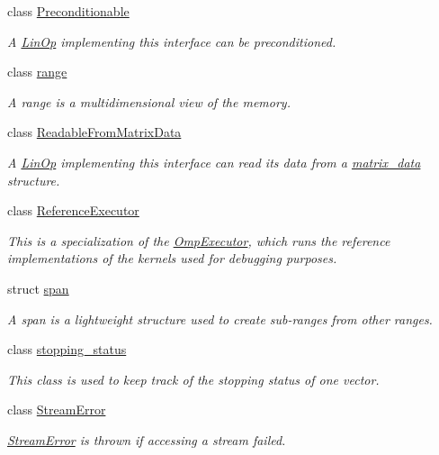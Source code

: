 \begin{DoxyCompactItemize}
class \hyperlink{classgko_1_1Preconditionable}{Preconditionable}
\begin{DoxyCompactList}\small\item\em A \hyperlink{classgko_1_1LinOp}{Lin\+Op} implementing this interface can be preconditioned. \end{DoxyCompactList}\item 
class \hyperlink{classgko_1_1range}{range}
\begin{DoxyCompactList}\small\item\em A range is a multidimensional view of the memory. \end{DoxyCompactList}\item 
class \hyperlink{classgko_1_1ReadableFromMatrixData}{Readable\+From\+Matrix\+Data}
\begin{DoxyCompactList}\small\item\em A \hyperlink{classgko_1_1LinOp}{Lin\+Op} implementing this interface can read its data from a \hyperlink{structgko_1_1matrix__data}{matrix\+\_\+data} structure. \end{DoxyCompactList}\item 
class \hyperlink{classgko_1_1ReferenceExecutor}{Reference\+Executor}
\begin{DoxyCompactList}\small\item\em This is a specialization of the \hyperlink{classgko_1_1OmpExecutor}{Omp\+Executor}, which runs the reference implementations of the kernels used for debugging purposes. \end{DoxyCompactList}\item 
struct \hyperlink{structgko_1_1span}{span}
\begin{DoxyCompactList}\small\item\em A span is a lightweight structure used to create sub-\/ranges from other ranges. \end{DoxyCompactList}\item 
class \hyperlink{classgko_1_1stopping__status}{stopping\+\_\+status}
\begin{DoxyCompactList}\small\item\em This class is used to keep track of the stopping status of one vector. \end{DoxyCompactList}\item 
class \hyperlink{classgko_1_1StreamError}{Stream\+Error}
\begin{DoxyCompactList}\small\item\em \hyperlink{classgko_1_1StreamError}{Stream\+Error} is thrown if accessing a stream failed. \end{DoxyCompactList}\item 

\end{DoxyCompactItemize}
